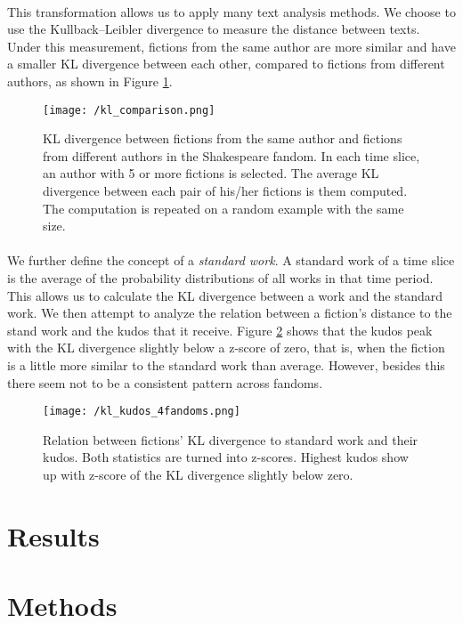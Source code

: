 \documentclass[11pt]{article} %
\begin{document}
\paragraph{} This transformation allows us to apply many text analysis methods. We choose to use the Kullback--Leibler divergence to measure the distance between texts. Under this measurement, fictions from the same author are more similar and have a smaller KL divergence between each other, compared to fictions from different authors, as shown in Figure \ref{fig:kl_comp}.


\begin{figure}[htbp]
\begin{center}
\texttt{[image: /kl\_comparison.png]}
\caption{KL divergence between fictions from the same author and fictions from different authors in the Shakespeare fandom. In each time slice, an author with 5 or more fictions is selected. The average KL divergence between each pair of his/her fictions is them computed. The computation is repeated on a random example with the same size. }
\label{fig:kl_comp}
\end{center}
\end{figure}

\paragraph{} We further define the concept of a \emph{standard work}. A standard work of a time slice is the average of the probability distributions of all works in that time period. This allows us to calculate the KL divergence between a work and the standard work. We then attempt to analyze the relation between a fiction's distance to the stand work and the kudos that it receive. Figure \ref{fig:kl_kudos} shows that the kudos peak with the KL divergence slightly below a z-score of zero, that is, when the fiction is a little more similar to the standard work than average. However, besides this there seem not to be a consistent pattern across fandoms.

\begin{figure}[htbp]
\begin{center}
\texttt{[image: /kl\_kudos\_4fandoms.png]}
\caption{Relation between fictions' KL divergence to standard work and their kudos. Both statistics are turned into z-scores. Highest kudos show up with z-score of the KL divergence slightly below zero.}
\label{fig:kl_kudos}
\end{center}
\end{figure}







\section{Results} %
\label{sec:results}


\section{Methods} %
\label{sec:methods}


\printbibliography
    
\end{document}

